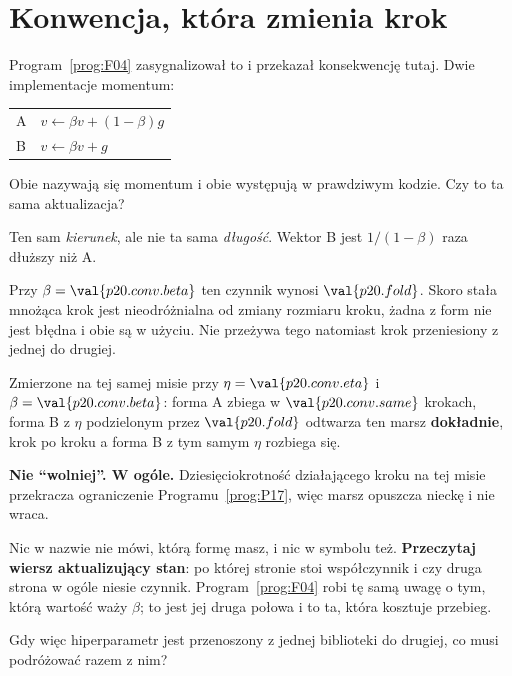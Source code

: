 \section{Konwencja, która zmienia krok}
\label{sec:P20-convention}

\begin{fr}
Program~\ref{prog:F04} zasygnalizował to i przekazał konsekwencję tutaj. Dwie
implementacje momentum:

\begin{center}
\begin{tabular}{ll}
\toprule
A & $v \leftarrow \beta v + (1-\beta) g$ \\
B & $v \leftarrow \beta v + g$ \\
\bottomrule
\end{tabular}
\end{center}

Obie nazywają się momentum i obie występują w prawdziwym kodzie. Czy to ta
sama aktualizacja?
\dotline
\nextframe
\end{fr}

\begin{fr}
\begin{ansblock}
Ten sam \emph{kierunek}, ale nie ta sama \emph{długość}. Wektor B jest
$1/(1-\beta)$ raza dłuższy niż A.
\end{ansblock}

Przy $\beta = \val{p20.conv.beta}$ ten czynnik wynosi $\val{p20.fold}$. Skoro
stała mnożąca krok jest nieodróżnialna od zmiany rozmiaru kroku, żadna z form
nie jest błędna i obie są w użyciu. Nie przeżywa tego natomiast krok
przeniesiony z jednej do drugiej.

Zmierzone na tej samej misie przy $\eta = \val{p20.conv.eta}$ i
$\beta = \val{p20.conv.beta}$: forma A zbiega w $\val{p20.conv.same}$ krokach,
forma B z $\eta$ podzielonym przez $\val{p20.fold}$ odtwarza ten marsz
\textbf{dokładnie}, krok po kroku \dash{} a forma B z tym samym $\eta$
rozbiega się.
\end{fr}

\begin{fr}
\begin{warning}
\textbf{Nie \enquote{wolniej}. W ogóle.} Dziesięciokrotność działającego kroku
na tej misie przekracza ograniczenie Programu~\ref{prog:P17}, więc marsz
opuszcza nieckę i nie wraca.

Nic w nazwie nie mówi, którą formę masz, i nic w symbolu też. \textbf{Przeczytaj
wiersz aktualizujący stan}: po której stronie stoi współczynnik i czy druga
strona w ogóle niesie czynnik. Program~\ref{prog:F04} robi tę samą uwagę o tym,
którą wartość waży $\beta$; to jest jej druga połowa i to ta, która kosztuje
przebieg.
\end{warning}

Gdy więc hiperparametr jest przenoszony z jednej biblioteki do drugiej, co
musi podróżować razem z nim?
\nextframe
\end{fr}


